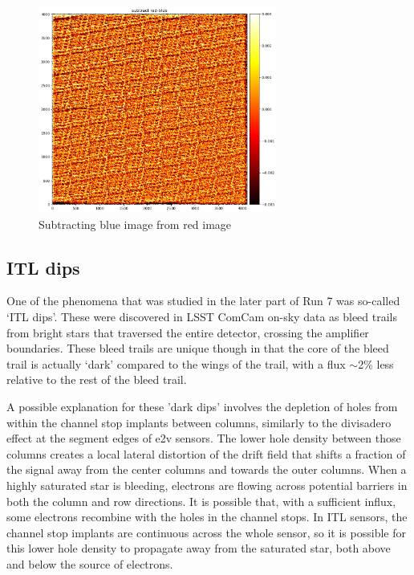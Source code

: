 \begin{figure}[ht]
\centering
\includegraphics[width=0.7\textwidth]{figures/subtract_red_blue.png}
\caption{Subtracting blue image from red image}
\label{fig:tree_ring_subtract_red_blue}
\end{figure}

\clearpage
\subsection{ITL dips}\label{itl-dips}

One of the phenomena that was studied in the later part of Run 7 was so-called 
`ITL dips'. These were discovered in LSST ComCam on-sky data as
bleed trails from bright stars that traversed the entire detector,
crossing the amplifier boundaries. These bleed trails are unique
though in that the core of the bleed trail is actually `dark'
compared to the wings of the trail, with a flux $\sim$2\% less relative to the rest of the
bleed trail. 

A possible explanation for these 'dark dips' involves the depletion of 
holes from within the channel stop implants between columns, similarly to the
divisadero effect at the segment edges of e2v sensors. The lower hole density 
between those columns creates a local lateral distortion of the drift field that shifts a fraction of the signal away from the center columns and towards the outer columns. 
When a highly saturated star is bleeding, electrons are flowing across potential barriers in both the column and row directions. It is possible that, with a sufficient influx, some electrons recombine with the holes in the channel stops. 
In ITL sensors, the channel stop implants are continuous across the whole sensor, so it is possible for this lower hole density to propagate away from the saturated star, both above and below the source of electrons.

